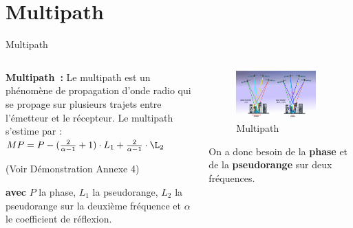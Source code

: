 \documentclass[xcolor=dvipsnames,envcountsect]{beamer}
\begin{document}
\section{Multipath}
\begin{frame}{Multipath}
	\begin{columns}
		\begin{column}{0.5\textwidth}
			\textbf{Multipath :} 
			Le multipath est un phénomène de propagation d'onde radio qui se propage sur plusieurs trajets entre l'émetteur et le récepteur.
			\newline
			Le multipath s'estime par : $MP = P - (\frac{2}{\alpha - 1} + 1) \cdot L_1 + \frac{2}{\alpha - 1} \cdot \L_2$
			\begin{flushright}
				\tiny{(Voir Démonstration Annexe 4)}
			\end{flushright}
			{\small \textbf{avec} $P$ la phase, $L_1$ la pseudorange, $L_2$ la pseudorange sur la deuxième fréquence et $\alpha$ le coefficient de réflexion.}
		\end{column}
		\begin{column}{0.5\textwidth}
			\begin{figure}
				\centering
				\includegraphics[width=0.9\textwidth]{./Figures/multipath2.png}
				\caption {Multipath \cite{esa}}	
			\end{figure}
			On a donc besoin de la \textbf{phase} et de la \textbf{pseudorange} sur deux fréquences.
		\end{column}	
	\end{columns}
\end{frame}
\end{document}
